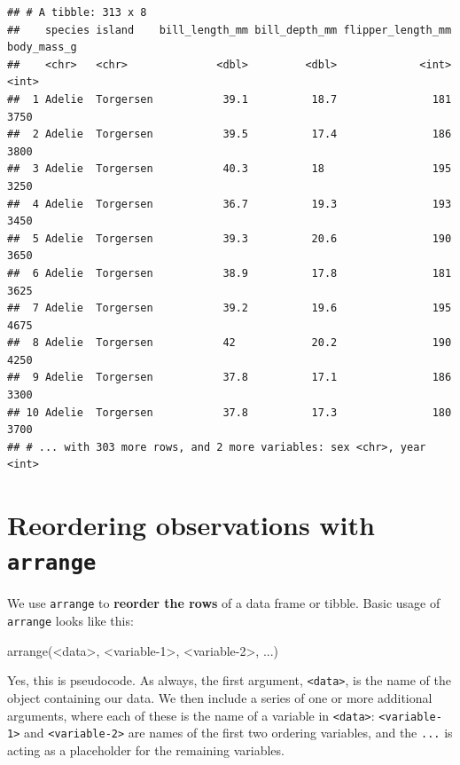 \documentclass[
]{book}
\newenvironment{Shaded}{\begin{snugshade}}{\end{snugshade}}
\newcommand{\DecValTok}[1]{\textcolor[rgb]{0.00,0.00,0.81}{#1}}
\newcommand{\FunctionTok}[1]{\textcolor[rgb]{0.00,0.00,0.00}{#1}}
\newcommand{\NormalTok}[1]{#1}
\newcommand{\SpecialCharTok}[1]{\textcolor[rgb]{0.00,0.00,0.00}{#1}}
\begin{document}
\begin{verbatim}
## # A tibble: 313 x 8
##    species island    bill_length_mm bill_depth_mm flipper_length_mm body_mass_g
##    <chr>   <chr>              <dbl>         <dbl>             <int>       <int>
##  1 Adelie  Torgersen           39.1          18.7               181        3750
##  2 Adelie  Torgersen           39.5          17.4               186        3800
##  3 Adelie  Torgersen           40.3          18                 195        3250
##  4 Adelie  Torgersen           36.7          19.3               193        3450
##  5 Adelie  Torgersen           39.3          20.6               190        3650
##  6 Adelie  Torgersen           38.9          17.8               181        3625
##  7 Adelie  Torgersen           39.2          19.6               195        4675
##  8 Adelie  Torgersen           42            20.2               190        4250
##  9 Adelie  Torgersen           37.8          17.1               186        3300
## 10 Adelie  Torgersen           37.8          17.3               180        3700
## # ... with 303 more rows, and 2 more variables: sex <chr>, year <int>
\end{verbatim}

\hypertarget{reordering-observations-with-arrange}{%
\section{\texorpdfstring{Reordering observations with \texttt{arrange}}{Reordering observations with arrange}}\label{reordering-observations-with-arrange}}

We use \texttt{arrange} to \textbf{reorder the rows} of a data frame or tibble. Basic usage of \texttt{arrange} looks like this:

\begin{Shaded}
\begin{Highlighting}[]
\FunctionTok{arrange}\NormalTok{(}\SpecialCharTok{\textless{}}\NormalTok{data}\SpecialCharTok{\textgreater{}}\NormalTok{, }\SpecialCharTok{\textless{}}\NormalTok{variable}\DecValTok{{-}1}\SpecialCharTok{\textgreater{}}\NormalTok{, }\SpecialCharTok{\textless{}}\NormalTok{variable}\DecValTok{{-}2}\SpecialCharTok{\textgreater{}}\NormalTok{, ...)}
\end{Highlighting}
\end{Shaded}

Yes, this is pseudocode. As always, the first argument, \texttt{\textless{}data\textgreater{}}, is the name of the object containing our data. We then include a series of one or more additional arguments, where each of these is the name of a variable in \texttt{\textless{}data\textgreater{}}: \texttt{\textless{}variable-1\textgreater{}} and \texttt{\textless{}variable-2\textgreater{}} are names of the first two ordering variables, and the \texttt{...} is acting as a placeholder for the remaining variables.
\end{document}
